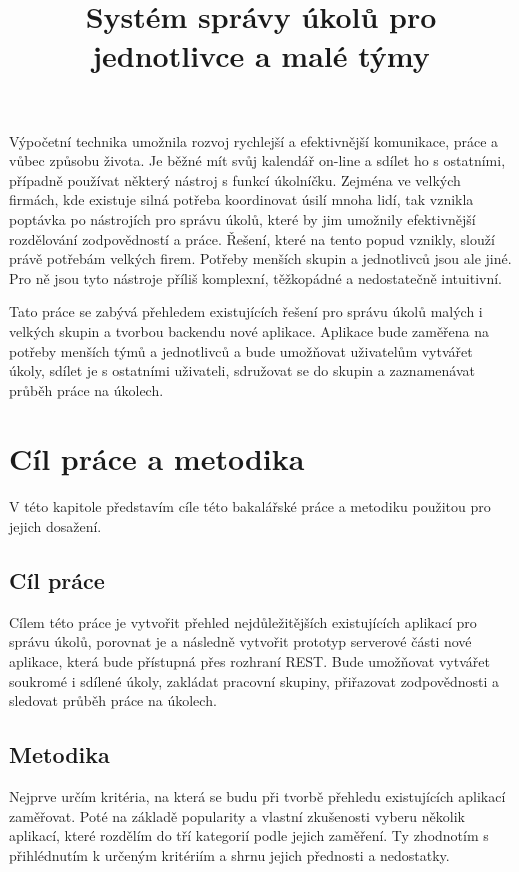 \documentclass[thesis=B,czech]{FITthesis}[2012/06/26]
\title{Systém správy úkolů pro jednotlivce a malé týmy}
\begin{document}

\begin{introduction}
	Výpočetní technika umožnila rozvoj rychlejší a efektivnější komunikace, práce a vůbec způsobu života. Je běžné mít svůj kalendář on-line a sdílet ho s ostatními, případně používat některý nástroj s funkcí úkolníčku. Zejména ve velkých firmách, kde existuje silná potřeba koordinovat úsilí mnoha lidí, tak vznikla poptávka po nástrojích pro správu úkolů, které by jim umožnily efektivnější rozdělování zodpovědností a práce. Řešení, které na tento popud vznikly, slouží právě potřebám velkých firem. Potřeby menších skupin a jednotlivců jsou ale jiné. Pro ně jsou tyto nástroje příliš komplexní, těžkopádné a nedostatečně intuitivní.

	Tato práce se zabývá přehledem existujících řešení pro správu úkolů malých i velkých skupin a tvorbou backendu nové aplikace. Aplikace bude zaměřena na potřeby menších týmů a jednotlivců a bude umožňovat uživatelům vytvářet úkoly, sdílet je s ostatními uživateli, sdružovat se do skupin a zaznamenávat průběh práce na úkolech. 
\end{introduction}

\chapter{Cíl práce a metodika}
	V této kapitole představím cíle této bakalářské práce a metodiku použitou pro jejich dosažení.
	\section{Cíl práce}
		Cílem této práce je vytvořit přehled nejdůležitějších existujících aplikací pro správu úkolů, porovnat je a následně vytvořit prototyp serverové části nové aplikace, která bude přístupná přes rozhraní REST. Bude umožňovat vytvářet soukromé i sdílené úkoly, zakládat pracovní skupiny, přiřazovat zodpovědnosti a sledovat průběh práce na úkolech. 
		
	\section{Metodika}
		Nejprve určím kritéria, na která se budu při tvorbě přehledu existujících aplikací zaměřovat. Poté na základě popularity a vlastní zkušenosti vyberu několik aplikací, které rozdělím do tří kategorií podle jejich zaměření. Ty zhodnotím s přihlédnutím k určeným kritériím a shrnu jejich přednosti a nedostatky.
		
\end{document}
